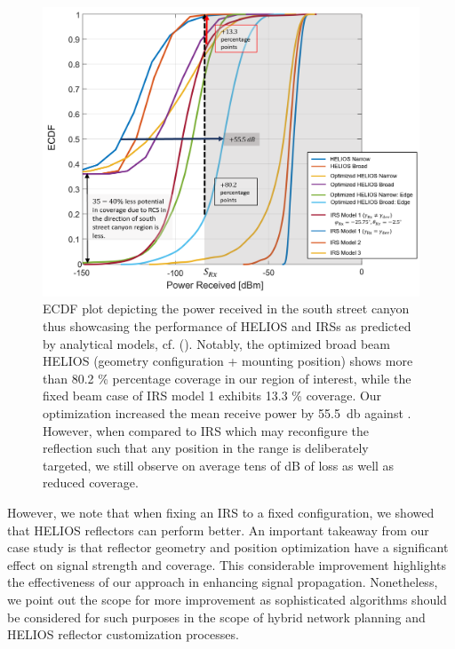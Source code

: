 \begin{figure}[H]
	\centering
	\includegraphics[width=1.0\linewidth]{images/Section 4 Images/Perfect_result_plot}
	\caption{ECDF plot depicting the power received in the south street canyon thus showcasing the performance of HELIOS and IRSs as predicted by analytical models, cf.  (\cite{8936989, ntontin2021optimal, tang2020wireless}). Notably, the optimized broad beam HELIOS (geometry configuration + mounting position) shows more than 80.2 \% percentage coverage in our region of interest, while the fixed beam case of IRS model 1 exhibits 13.3 \% coverage. Our optimization increased the mean receive power by \SI{55.5}{\decibel} against \cite{Helios}. However, when compared to IRS which may reconfigure the reflection such that any position in the range is deliberately targeted, we still observe on average tens of dB of loss as well as reduced coverage.}
	\label{fig:Perfect_result_plot}
\end{figure}
However, we note that when fixing an IRS to a fixed configuration, we showed that HELIOS reflectors can perform better. An important takeaway from our case study is that reflector geometry and position optimization have a significant effect on signal strength and coverage. This considerable improvement highlights the effectiveness of our approach in enhancing signal propagation. Nonetheless, we point out the scope for more improvement as sophisticated algorithms should be considered for such purposes in the scope of hybrid network planning and HELIOS reflector customization processes.
